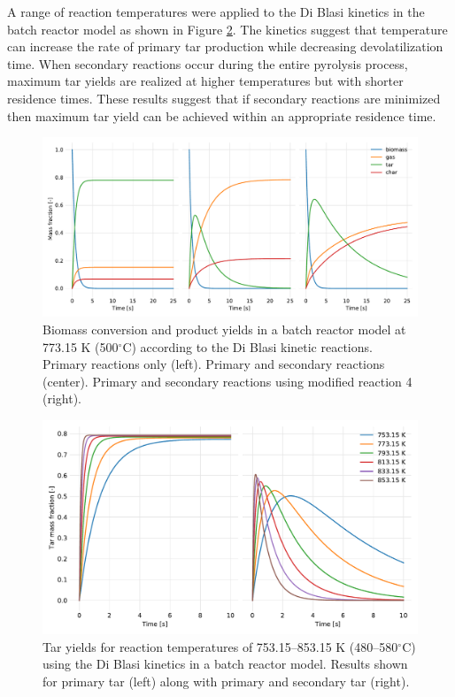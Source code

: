 \documentclass{article}
\begin{document}
A range of reaction temperatures were applied to the Di Blasi kinetics in the batch reactor model as shown in Figure \ref{fig:batch-blasi-temps}. The kinetics suggest that temperature can increase the rate of primary tar production while decreasing devolatilization time. When secondary reactions occur during the entire pyrolysis process, maximum tar yields are realized at higher temperatures but with shorter residence times. These results suggest that if secondary reactions are minimized then maximum tar yield can be achieved within an appropriate residence time.

\begin{figure}[H]
    \centering
    \includegraphics[width=\textwidth]{batch-blasi.pdf}
    \caption{Biomass conversion and product yields in a batch reactor model at 773.15 K (500$^\circ$C) according to the Di Blasi kinetic reactions. Primary reactions only (left). Primary and secondary reactions (center). Primary and secondary reactions using modified reaction 4 (right).}
    \label{fig:batch-blasi}
\end{figure}

\begin{figure}[H]
    \centering
    \includegraphics[width=\textwidth]{batch-blasi-temps.pdf}
    \caption{Tar yields for reaction temperatures of 753.15--853.15 K (480--580$^\circ$C) using the Di Blasi kinetics in a batch reactor model. Results shown for primary tar (left) along with primary and secondary tar (right).}
    \label{fig:batch-blasi-temps}
\end{figure}


\printbibliography
\end{document}

